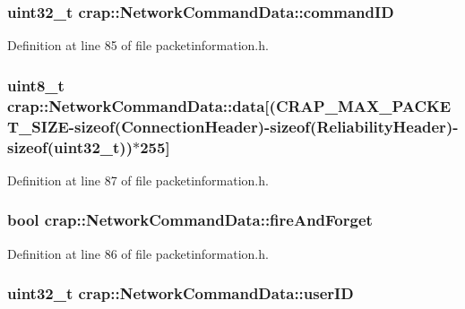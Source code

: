 \subsubsection[{command\+I\+D}]{\setlength{\rightskip}{0pt plus 5cm}uint32\+\_\+t crap\+::\+Network\+Command\+Data\+::command\+I\+D}\label{structcrap_1_1_network_command_data_a93c879cf1159768fa568e9c4a0364f44}


Definition at line 85 of file packetinformation.\+h.

\hypertarget{structcrap_1_1_network_command_data_aa159e9a9585623cee765622ea6289ec0}{}
\subsubsection[{data}]{\setlength{\rightskip}{0pt plus 5cm}uint8\+\_\+t crap\+::\+Network\+Command\+Data\+::data\mbox{[}({\bf C\+R\+A\+P\+\_\+\+M\+A\+X\+\_\+\+P\+A\+C\+K\+E\+T\+\_\+\+S\+I\+Z\+E}-\/sizeof({\bf Connection\+Header})-\/sizeof({\bf Reliability\+Header})-\/sizeof(uint32\+\_\+t))$\ast$255\mbox{]}}\label{structcrap_1_1_network_command_data_aa159e9a9585623cee765622ea6289ec0}


Definition at line 87 of file packetinformation.\+h.

\hypertarget{structcrap_1_1_network_command_data_a686dbe93704fdf7b08a69ff62c34daf8}{}
\subsubsection[{fire\+And\+Forget}]{\setlength{\rightskip}{0pt plus 5cm}bool crap\+::\+Network\+Command\+Data\+::fire\+And\+Forget}\label{structcrap_1_1_network_command_data_a686dbe93704fdf7b08a69ff62c34daf8}


Definition at line 86 of file packetinformation.\+h.

\hypertarget{structcrap_1_1_network_command_data_a91ac863907f7ea4beb9f4584b71909ba}{}
\subsubsection[{user\+I\+D}]{\setlength{\rightskip}{0pt plus 5cm}uint32\+\_\+t crap\+::\+Network\+Command\+Data\+::user\+I\+D}\label{structcrap_1_1_network_command_data_a91ac863907f7ea4beb9f4584b71909ba}


